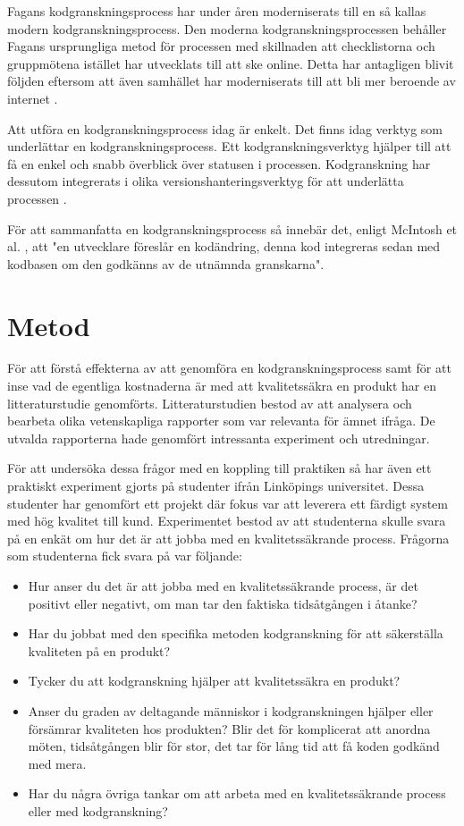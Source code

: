 Fagans \cite{fagan1999design} kodgranskningsprocess har under åren moderniserats till en så kallas modern kodgranskningsprocess. Den moderna kodgranskningsprocessen behåller Fagans ursprungliga metod för processen med skillnaden att checklistorna och gruppmötena istället har utvecklats till att ske online. Detta har antagligen blivit följden eftersom att även samhället har moderniserats till att bli mer beroende av internet \cite{shimagaki2016study}.

Att utföra en kodgranskningsprocess idag är enkelt. Det finns idag verktyg som underlättar en kodgranskningsprocess. Ett kodgranskningsverktyg hjälper till att få en enkel och snabb överblick över statusen i processen. Kodgranskning har dessutom integrerats i olika versionshanteringsverktyg för att underlätta processen \cite{shimagaki2016study}. 

För att sammanfatta en kodgranskningsprocess så innebär det, enligt McIntosh et al. \cite{shimagaki2016study}, att "en utvecklare föreslår en kodändring, denna kod integreras sedan med kodbasen om den godkänns av de utnämnda granskarna".


\section{Metod}
\label{sec:method-wallstrom}

För att förstå effekterna av att genomföra en kodgranskningsprocess samt för att inse vad de egentliga kostnaderna är med att kvalitetssäkra en produkt har en litteraturstudie genomförts. Litteraturstudien bestod av att analysera och bearbeta olika vetenskapliga rapporter som var relevanta för ämnet ifråga. De utvalda rapporterna hade genomfört intressanta experiment och utredningar.

För att undersöka dessa frågor med en koppling till praktiken så har även ett praktiskt experiment gjorts på studenter ifrån Linköpings universitet. Dessa studenter har genomfört ett projekt där fokus var att leverera ett färdigt system med hög kvalitet till kund. Experimentet bestod av att studenterna skulle svara på en enkät om hur det är att jobba med en kvalitetssäkrande process. Frågorna som studenterna fick svara på var följande:

\begin{itemize}
	\item Hur anser du det är att jobba med en kvalitetssäkrande process, är det positivt eller negativt, om man tar den faktiska tidsåtgången i åtanke?
	\item Har du jobbat med den specifika metoden kodgranskning för att säkerställa kvaliteten på en produkt?
	\item Tycker du att kodgranskning hjälper att kvalitetssäkra en produkt?
	\item Anser du graden av deltagande människor i kodgranskningen hjälper eller försämrar kvaliteten hos produkten? Blir det för komplicerat att anordna möten, tidsåtgången blir för stor, det tar för lång tid att få koden godkänd med mera.
	\item Har du några övriga tankar om att arbeta med en kvalitetssäkrande process eller med kodgranskning?
\end{itemize}

